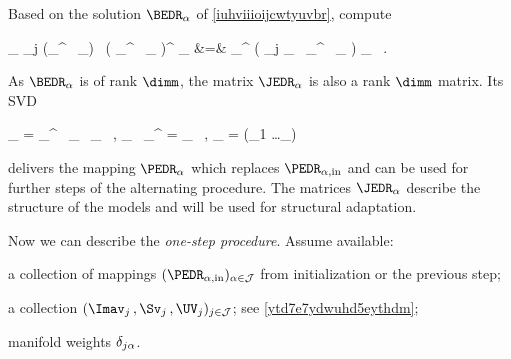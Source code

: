 Based on the solution \( \BEDR_{\jl} \) of \eqref{iuhviiioijcwtyuvbr}, compute
\begin{EQA}[rcl]
	\JEDR_{\jl}
	\eqdef
	\sum_{j \in \JJJ} (\BEDR_{\jl}^{\T} \, \fclv_{\jjl}) \, \bigl( \BEDR_{\jl}^{\T} \, \fclv_{\jjl} \bigr)^{\T}
		\weightM_{\jjl}
	&=&
	\BEDR_{\jl}^{\T} \biggl( 
		\sum_{j \in \JJJ} \fclv_{\jjl} \, \fclv_{\jjl}^{\T} \, \weightM_{\jjl} 
	\biggr) \BEDR_{\jl}
	\, .
\label{jhuifdyu8v8i6445hve}
\end{EQA}
As \( \BEDR_{\jl} \) is of rank \( \dimm \), the matrix \( \JEDR_{\jl} \) is 
also a rank \( \dimm \) matrix. 
Its SVD 
\begin{EQA}[c]
	\JEDR_{\jl}
	=
	\PEDR_{\jl}^{\T} \, \Lambda_{\jl} \, \PEDR_{\jl}
	\, ,
	\qquad
	\PEDR_{\jl} \, \PEDR_{\jl}^{\T}
	= 
	\Id_{\dimm}
	\, ,
	\qquad
	\Lambda_{\jl} = \diag(\lambda_{1} \geq \ldots \geq \lambda_{\dimm})
	\, 
	\qquad
\label{jhfuui887678ucfhie3}
\end{EQA}
delivers the mapping \( \PEDR_{\jl} \) which 
replaces \( \PEDR_{\jl,\init} \) and can be used for further steps
of the alternating procedure.
The matrices \( \JEDR_{\jl} \) describe the structure of the models and will be used 
for structural adaptation.

Now we can describe the \emph{one-step procedure}. 
Assume available:
%
\begin{mylist}
	\item 
	a collection of mappings \( (\PEDR_{\jl,\init})_{\jl \in \JJJ} \) from 
	initialization or the previous step;

	\item 
	a collection \( (\Imav_{j} \, , \Sv_{j} \, , \UV_{j})_{j \in \JJJ} \); see \eqref{ytd7e7ydwuhd5eythdm};

	\item 
 	manifold weights \( \delta_{j\alpha} \).
\end{mylist}
%
